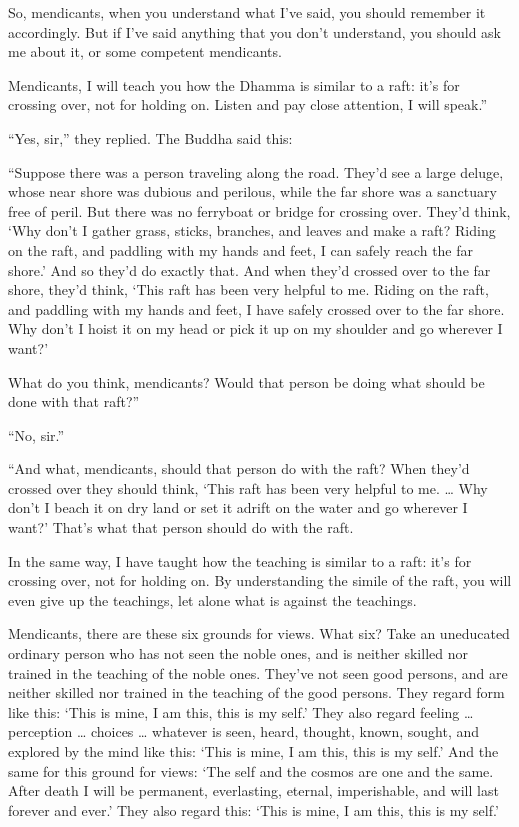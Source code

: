\documentclass[12pt,openany]{book}%
\begin{document}
So, mendicants, when you understand what I’ve said, you should remember it accordingly. But if I’ve said anything that you don’t understand, you should ask me about it, or some competent mendicants. 

Mendicants, I will teach you how the Dhamma is similar to a raft: it’s for crossing over, not for holding on. Listen and pay close attention, I will speak.” 

“Yes, sir,” they replied. The Buddha said this: 

“Suppose there was a person traveling along the road. They’d see a large deluge, whose near shore was dubious and perilous, while the far shore was a sanctuary free of peril. But there was no ferryboat or bridge for crossing over. They’d think, ‘Why don’t I gather grass, sticks, branches, and leaves and make a raft? Riding on the raft, and paddling with my hands and feet, I can safely reach the far shore.’ And so they’d do exactly that. And when they’d crossed over to the far shore, they’d think, ‘This raft has been very helpful to me. Riding on the raft, and paddling with my hands and feet, I have safely crossed over to the far shore. Why don’t I hoist it on my head or pick it up on my shoulder and go wherever I want?’ 

What do you think, mendicants? Would that person be doing what should be done with that raft?” 

“No, sir.” 

“And what, mendicants, should that person do with the raft? When they’d crossed over they should think, ‘This raft has been very helpful to me. … Why don’t I beach it on dry land or set it adrift on the water and go wherever I want?’ That’s what that person should do with the raft. 

In the same way, I have taught how the teaching is similar to a raft: it’s for crossing over, not for holding on. By understanding the simile of the raft, you will even give up the teachings, let alone what is against the teachings. 

Mendicants, there are these six grounds for views. What six? Take an uneducated ordinary person who has not seen the noble ones, and is neither skilled nor trained in the teaching of the noble ones. They’ve not seen good persons, and are neither skilled nor trained in the teaching of the good persons. They regard form like this: ‘This is mine, I am this, this is my self.’ They also regard feeling … perception … choices … whatever is seen, heard, thought, known, sought, and explored by the mind like this: ‘This is mine, I am this, this is my self.’ And the same for this ground for views: ‘The self and the cosmos are one and the same. After death I will be permanent, everlasting, eternal, imperishable, and will last forever and ever.’ They also regard this: ‘This is mine, I am this, this is my self.’ 
\end{document}
